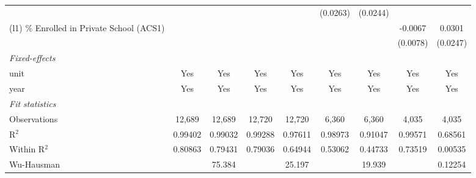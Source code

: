 \documentclass[
  10pt,
]{article}
\begin{document}
\begin{table}[htbp]
\begin{adjustbox}{max width=\linewidth}
\begin{tabular}{lcccccccc}
                                                        &                     &                         &                     &                       & (0.0263)               & (0.0244)                              &                        &   \\   
         (l1) \% Enrolled in Private School (ACS1)      &                     &                         &                     &                       &                        &                                       & -0.0067                & 0.0301\\   
                                                        &                     &                         &                     &                       &                        &                                       & (0.0078)               & (0.0247)\\   
         \midrule
         \emph{Fixed-effects}\\
         unit                                           & Yes                 & Yes                     & Yes                 & Yes                   & Yes                    & Yes                                   & Yes                    & Yes\\  
         year                                           & Yes                 & Yes                     & Yes                 & Yes                   & Yes                    & Yes                                   & Yes                    & Yes\\  
         \midrule
         \emph{Fit statistics}\\
         Observations                                   & 12,689              & 12,689                  & 12,720              & 12,720                & 6,360                  & 6,360                                 & 4,035                  & 4,035\\  
         R$^2$                                          & 0.99402             & 0.99032                 & 0.99288             & 0.97611               & 0.98973                & 0.91047                               & 0.99571                & 0.68561\\  
         Within R$^2$                                   & 0.80863             & 0.79431                 & 0.79036             & 0.64944               & 0.53062                & 0.44733                               & 0.73519                & 0.00535\\  
         Wu-Hausman                                     &                     & 75.384                  &                     & 25.197                &                        & 19.939                                &                        & 0.12254\\  

\end{tabular}
\end{adjustbox}
\end{table}
\end{document}
